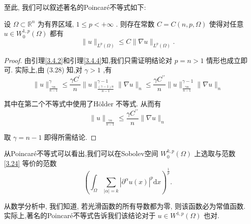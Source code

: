 \documentclass[lang=cn,newtx,10pt,scheme=chinese,thmcnt=chapter]{elegantbook}
\newcommand{\dif}{\mathrm{d}}
\begin{document}
至此, 我们可以叙述著名的Poincaré不等式如下:
\begin{corollary}
    设 \(\Omega  \subset  {\mathbb{R}}^{n}\) 为有界区域, \(1 \leqslant  p <  + \infty\) . 则存在常数 \(C = C\left( {n,p,\Omega }\right)\) 使得对任意 \(u \in  {W}_{0}^{1,p}\left( \Omega \right)\) 都有
\begin{equation*}
\parallel u{\parallel }_{{L}^{p}\left( \Omega \right) } \leqslant  C\parallel \nabla u{\parallel }_{{L}^{p}\left( \Omega \right) }.
\end{equation*}

\end{corollary}
\begin{proof}
     由引理\ref{3.4.2}和引理\ref{3.4.4}知,我们只需证明结论对 \(p = n > 1\) 情形也成立即可. 实际上,由 (3.28) 知,对 \(\gamma  > 1\) ,有
\begin{equation*}
\parallel u{\parallel }_{\frac{\gamma n}{n - 1}}^{\gamma } \leqslant  \frac{\gamma {C}^{\prime }}{n}\parallel u{\parallel }_{\frac{\left( {\gamma  - 1}\right) n}{n - 1}}^{\gamma  - 1}\parallel \nabla u{\parallel }_{n}
\leqslant  \frac{\gamma {C}^{\prime \prime }}{n}\parallel u{\parallel }_{\frac{\gamma n}{n - 1}}^{\gamma  - 1}\parallel \nabla u{\parallel }_{n}
\end{equation*}

其中在第二个不等式中使用了Hölder 不等式. 从而有
\begin{equation*}
\parallel u{\parallel }_{\frac{\gamma n}{n - 1}} \leqslant  \frac{\gamma {C}^{\prime \prime }}{n}\parallel \nabla u{\parallel }_{n}
\end{equation*}

取 \(\gamma  = n - 1\) 即得所需结论.
\end{proof}
\begin{note}
    从Poincaré不等式可以看出,我们可以在Sobolev空间 \({W}_{0}^{k,p}\left( \Omega \right)\) 上选取与范数 \ref{3.24} 等价的范数
\begin{equation*}
{\left( {\int }_{\Omega }\mathop{\sum }\limits_{{\left| \alpha \right|  = k}}{\left| {\partial }^{\alpha }u\left( x\right) \right| }^{p}\dif x\right) }^{\frac{1}{p}}.
\end{equation*}

从数学分析中, 我们知道, 若光滑函数的所有导数都为零, 则该函数必为常值函数. 实际上,著名的Poincaré不等式告诉我们该结论对于 \(u \in  {W}^{1,p}\left( \Omega \right)\) 也对.
\end{note}
\end{document}
